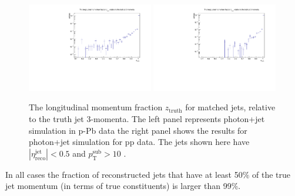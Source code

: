 \begin{figure}
\center
\includegraphics[width=0.49\textwidth]{JetReco/ztruth_pPb}
\includegraphics[width=0.49\textwidth]{JetReco/ztruth_pp}\\
\label{fig:ztruthmatching}
\caption{The longitudinal momentum fraction $z_{\mathrm{truth}}$ for matched jets, relative to the truth jet 3-momenta. The left panel represents photon+jet simulation in p-Pb data the right panel shows the results for photon+jet simulation for pp data. The jets shown here have $|\eta^{\mathrm{jet}}_{\mathrm{reco}}|<0.5$ and $p_{\mathrm{T}}^{\mathrm{sub}}> 10$ \GeVc.}
\end{figure}

In all cases the fraction of reconstructed jets that have at least 50$\%$ of the true jet momentum (in terms of true constituents) is larger than 99$\%$. 

\FloatBarrier
